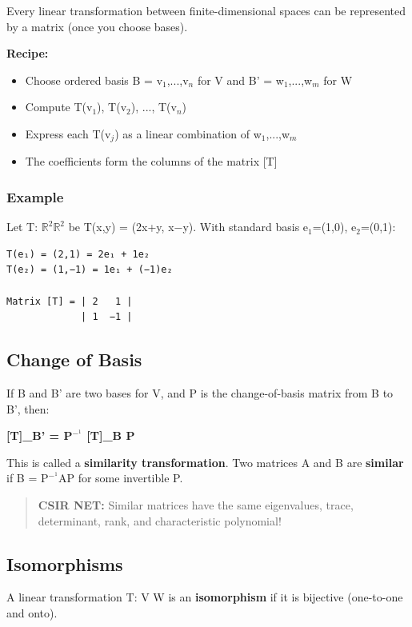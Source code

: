 \documentclass[12pt,a4paper,openany]{book}
\begin{document}
{{Every linear transformation between finite-dimensional spaces can be represented by a matrix (once you choose bases).

\textbf{Recipe:}
\begin{itemize}
  \item Choose ordered basis B = {v$_1$,...,v$_n$} for V and B' = {w$_1$,...,w$_m$} for W
  \item Compute T(v$_1$), T(v$_2$), ..., T(v$_n$)
  \item Express each T(v$_j$) as a linear combination of w$_1$,...,w$_m$
  \item The coefficients form the columns of the matrix [T]
\end{itemize}

\subsubsection{Example}
Let T: $\mathbb{R}^2\mathbb{R}^2$ be T(x,y) = (2x+y, x−y). With standard basis e$_1$=(1,0), e$_2$=(0,1):

\begin{verbatim}
T(e₁) = (2,1) = 2e₁ + 1e₂
T(e₂) = (1,−1) = 1e₁ + (−1)e₂

Matrix [T] = | 2   1 |
             | 1  −1 |
\end{verbatim}

\subsection{Change of Basis}

If B and B' are two bases for V, and P is the change-of-basis matrix from B to B', then:

\textbf{[T]_B' = P$^{-}^1$ [T]_B P}

This is called a \textbf{similarity transformation}. Two matrices A and B are \textbf{similar} if B = P$^{-}^1$AP for some invertible P.

\begin{quote}
\textbf{ CSIR NET:} Similar matrices have the same eigenvalues, trace, determinant, rank, and characteristic polynomial!
\end{quote}

\subsection{Isomorphisms}

A linear transformation T: V  W is an \textbf{isomorphism} if it is bijective (one-to-one and onto).

}}
\end{document}
